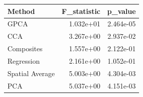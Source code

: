 \begin{tabular}{lrr}
\toprule
Method & F_statistic & p_value \\
\midrule
GPCA & 1.032e+01 & 2.464e-05 \\
CCA & 3.267e+00 & 2.937e-02 \\
Composites & 1.557e+00 & 2.122e-01 \\
Regression & 2.161e+00 & 1.052e-01 \\
Spatial Average & 5.003e+00 & 4.304e-03 \\
PCA & 5.037e+00 & 4.151e-03 \\
\bottomrule
\end{tabular}
